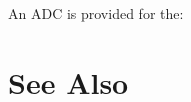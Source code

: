
An ADC is provided for the:
\begin{adclist}
\end{adclist}

\section{See Also}
\begin{typelist}
\end{typelist}